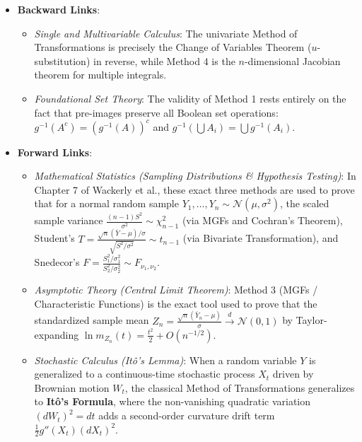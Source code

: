 \documentclass[11pt, letterpaper]{article}
\theoremstyle{definition}
\theoremstyle{remark}
\begin{document}
\begin{itemize}
    \item \textbf{Backward Links}:
    \begin{itemize}
        \item \textit{Single and Multivariable Calculus}: The univariate Method of Transformations is precisely the Change of Variables Theorem ($u$-substitution) in reverse, while Method 4 is the $n$-dimensional Jacobian theorem for multiple integrals.
        \item \textit{Foundational Set Theory}: The validity of Method 1 rests entirely on the fact that pre-images preserve all Boolean set operations: $g^{-1}(A^c) = (g^{-1}(A))^c$ and $g^{-1}(\bigcup A_i) = \bigcup g^{-1}(A_i)$.
    \end{itemize}
    \item \textbf{Forward Links}:
    \begin{itemize}
        \item \textit{Mathematical Statistics (Sampling Distributions \& Hypothesis Testing)}: In Chapter 7 of Wackerly et al., these exact three methods are used to prove that for a normal random sample $Y_1, \dots, Y_n \sim \mathcal{N}(\mu, \sigma^2)$, the scaled sample variance $\frac{(n-1)S^2}{\sigma^2} \sim \chi^2_{n-1}$ (via MGFs and Cochran's Theorem), Student's $T = \frac{\sqrt{n}(\bar{Y}-\mu)/ \sigma}{\sqrt{S^2/\sigma^2}} \sim t_{n-1}$ (via Bivariate Transformation), and Snedecor's $F = \frac{S_1^2/\sigma_1^2}{S_2^2/\sigma_2^2} \sim F_{\nu_1, \nu_2}$.
        \item \textit{Asymptotic Theory (Central Limit Theorem)}: Method 3 (MGFs / Characteristic Functions) is the exact tool used to prove that the standardized sample mean $Z_n = \frac{\sqrt{n}(\bar{Y}_n - \mu)}{\sigma} \xrightarrow{d} \mathcal{N}(0, 1)$ by Taylor-expanding $\ln m_{Z_n}(t) = \frac{t^2}{2} + O(n^{-1/2})$.
        \item \textit{Stochastic Calculus (Itô's Lemma)}: When a random variable $Y$ is generalized to a continuous-time stochastic process $X_t$ driven by Brownian motion $W_t$, the classical Method of Transformations generalizes to \textbf{Itô's Formula}, where the non-vanishing quadratic variation $(dW_t)^2 = dt$ adds a second-order curvature drift term $\frac{1}{2}g''(X_t)(dX_t)^2$.
    \end{itemize}

\newpage

\end{itemize}
\end{document}
